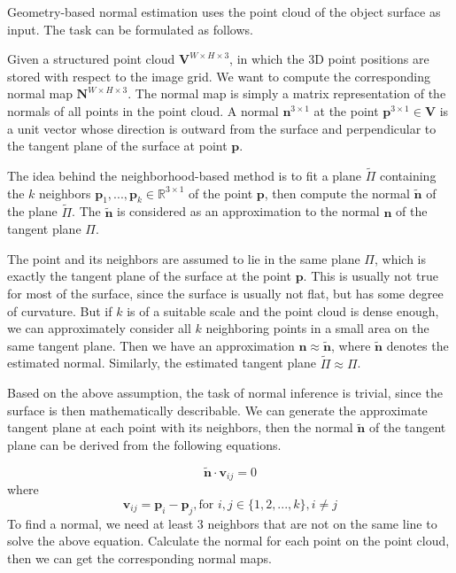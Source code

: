 Geometry-based normal estimation uses the point cloud of the object surface as input. The task can be formulated as follows.

Given a structured point cloud $ \textbf{V}^{W\times H\times 3} $, in which the 3D point positions are stored with respect to the image grid. We want to compute the corresponding normal map $ \textbf{N}^{W\times H \times 3} $. The normal map is simply a matrix representation of the normals of all points in the point cloud. A normal $ \textbf{n}^{3\times 1} $ at the point $ \textbf{p}^{3\times 1} \in \textbf{V} $ is a unit vector whose direction is outward from the surface and perpendicular to the tangent plane of the surface at point $ \textbf{p} $.


The idea behind the neighborhood-based method is to fit a plane $ \tilde\Pi $ containing the $ k $ neighbors $ \textbf{p}_1, ..., \textbf{p}_k \in \mathbb{R}^{3\times1} $ of the point $ \textbf{p} $, then compute the normal $ \tilde{\textbf{n}} $ of the plane $ \tilde\Pi $. The $ \tilde{\textbf{n}} $ is considered as an approximation to the normal $ \textbf{n} $ of the tangent plane $ \Pi $.

The point and its neighbors are assumed to lie in the same plane $ \Pi $, which is exactly the tangent plane of the surface at the point $\textbf{p} $. 
This is usually not true for most of the surface, since the surface is usually not flat, but has some degree of curvature. But if $ k $ is of a suitable scale and the point cloud is dense enough, we can approximately consider all $ k $ neighboring points in a small area on the same tangent plane. Then we have an approximation $ \textbf{n} \approx \tilde{\textbf{n}}$, where $ \tilde{\textbf{n}}$ denotes the estimated normal. Similarly, the estimated tangent plane $ \tilde{\Pi} \approx \Pi $. 


Based on the above assumption, the task of normal inference is trivial, since the surface is then mathematically describable. We can generate the approximate tangent plane at each point with its neighbors, then the normal $ \tilde{\textbf{n}} $ of the tangent plane can be derived from the following equations.

\[\tilde{\textbf{n}} \cdot \textbf{v}_{ij} = 0 \]
where 
\[ \textbf{v}_{ij} = \textbf{p}_i - \textbf{p}_j, \text{for } i, j \in \{ 1,2,...,k\}, i\neq j \]
To find a normal, we need at least 3 neighbors that are not on the same line to solve the above equation. Calculate the normal for each point on the point cloud, then we can get the corresponding normal maps. 


